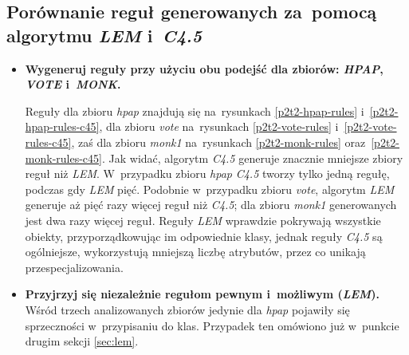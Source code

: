 \subsection{Porównanie reguł generowanych za~pomocą algorytmu \emph{LEM} i~\emph{C4.5}}

\begin{itemize}
\item \textbf{Wygeneruj reguły przy użyciu obu podejść dla zbiorów: \emph{HPAP}, \emph{VOTE} i~\emph{MONK}.}

	
	
	
	
	
	
Reguły dla zbioru \emph{hpap} znajdują się na~rysunkach \ref{p2t2-hpap-rules} i~\ref{p2t2-hpap-rules-c45}, dla zbioru \emph{vote} na~rysunkach \ref{p2t2-vote-rules} i~\ref{p2t2-vote-rules-c45}, zaś dla zbioru \emph{monk1} na~rysunkach \ref{p2t2-monk-rules} oraz~\ref{p2t2-monk-rules-c45}. Jak widać, algorytm \emph{C4.5} generuje znacznie mniejsze zbiory reguł niż \emph{LEM}. W~przypadku zbioru \emph{hpap} \emph{C4.5} tworzy tylko jedną regułę, podczas gdy \emph{LEM} pięć. Podobnie w~przypadku zbioru \emph{vote}, algorytm \emph{LEM} generuje aż pięć razy więcej reguł niż \emph{C4.5}; dla zbioru \emph{monk1} generowanych jest dwa razy więcej reguł. Reguły \emph{LEM} wprawdzie pokrywają wszystkie obiekty, przyporządkowując im odpowiednie klasy, jednak reguły \emph{C4.5} są ogólniejsze, wykorzystują mniejszą liczbę atrybutów, przez co unikają przespecjalizowania.

\item \textbf{Przyjrzyj się niezależnie regułom pewnym i~możliwym (\emph{LEM}).}
\\Wśród trzech analizowanych zbiorów jedynie dla \emph{hpap} pojawiły się sprzeczności w~przypisaniu do klas. Przypadek ten omówiono już w~punkcie drugim sekcji \ref{sec:lem}.
\end{itemize}

